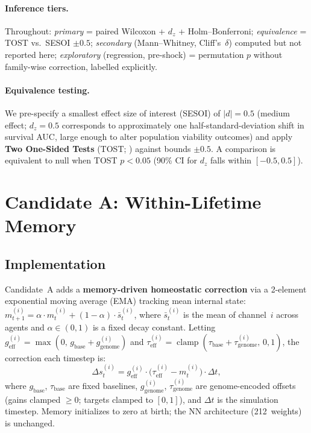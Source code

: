 \documentclass[letterpaper]{article}
\begin{document}
\paragraph{Inference tiers.}
Throughout: \emph{primary} = paired Wilcoxon + $d_z$ + Holm--Bonferroni;
\emph{equivalence} = TOST vs.\ SESOI $\pm 0.5$; \emph{secondary}
(Mann--Whitney, Cliff's~$\delta$) computed but not reported here;
\emph{exploratory} (regression, pre-shock) = permutation $p$ without
family-wise correction, labelled explicitly.

\paragraph{Equivalence testing.}
We pre-specify a smallest effect size of interest (SESOI) of $|d| = 0.5$
(medium effect; $d_z = 0.5$ corresponds to approximately one
half-standard-deviation shift in survival AUC, large enough to alter
population viability outcomes) and apply \textbf{Two One-Sided Tests}
(TOST; \citealt{lakens_2017_equivalence}) against bounds $\pm 0.5$.
A comparison is equivalent to null when TOST $p < 0.05$ (90\% CI for
$d_z$ falls within $[-0.5, 0.5]$).


\section{Candidate A: Within-Lifetime Memory}

\subsection{Implementation}

Candidate~A adds a \textbf{memory-driven homeostatic correction} via a
2-element exponential moving average (EMA) tracking mean internal state:
$m_{t+1}^{(i)} = \alpha \cdot m_t^{(i)} + (1 - \alpha) \cdot
\bar{s}_t^{(i)}$,
where $\bar{s}_t^{(i)}$ is the mean of channel~$i$ across agents and
$\alpha \in (0,1)$ is a fixed decay constant.
Letting $g_\text{eff}^{(i)} = \max(0,\, g_\text{base} + g_\text{genome}^{(i)})$
and $\tau_\text{eff}^{(i)} = \operatorname{clamp}(\tau_\text{base} +
\tau_\text{genome}^{(i)},\, 0, 1)$, the correction each timestep is:
\begin{equation}
\Delta s_t^{(i)} = g_\text{eff}^{(i)} \cdot
  \bigl(\tau_\text{eff}^{(i)} - m_t^{(i)}\bigr) \cdot \Delta t,
\label{eq:ema}
\end{equation}
where $g_\text{base}$, $\tau_\text{base}$ are fixed baselines,
$g_\text{genome}^{(i)}$, $\tau_\text{genome}^{(i)}$ are genome-encoded
offsets (gains clamped $\geq 0$; targets clamped to $[0,1]$), and
$\Delta t$ is the simulation timestep.
Memory initializes to zero at birth; the NN architecture (212~weights) is
unchanged.
\end{document}
